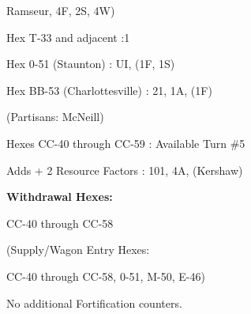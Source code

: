 Ramseur, 4F, 2S, 4W)

\begin{scenariodata}
Hex T-33 and adjacent :1\\
\end{scenariodata}

\begin{scenariodata}
Hex 0-51 (Staunton) : UI, (1F, 1S)\\
\end{scenariodata}

\begin{scenariodata}
Hex BB-53 (Charlottesville) : 21, 1A, (1F)\\
\end{scenariodata}

\begin{scenariodata}
(Partisans: McNeill)\\
\end{scenariodata}

\begin{scenariodata}
Hexes CC-40 through CC-59 : Available Turn \#5\\
\end{scenariodata}

\begin{scenariodata}
Adds + 2 Resource Factors : 101, 4A, (Kershaw)\\
\end{scenariodata}

\begin{scenariodata}
\textbf{Withdrawal Hexes:}\\
\end{scenariodata}

\begin{scenariodata}
CC-40 through CC-58\\
\end{scenariodata}

\begin{scenariodata}
(Supply/Wagon Entry Hexes:\\
\end{scenariodata}

\begin{scenariodata}
CC-40 through CC-58, 0-51, M-50, E-46)\\
\end{scenariodata}

\begin{scenariodata}
No additional Fortification counters.\\
\end{scenariodata}

